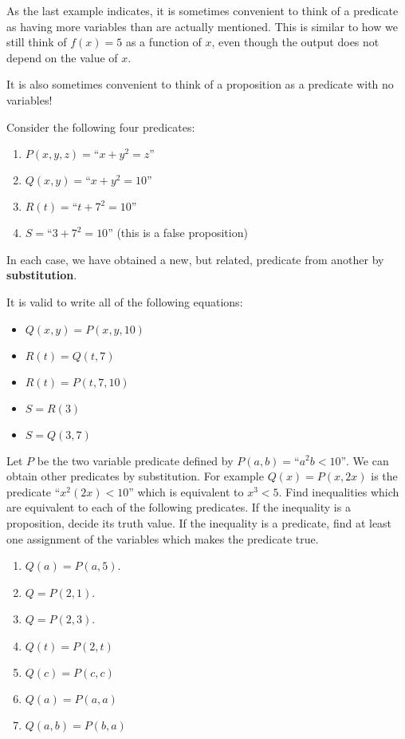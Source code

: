 As the last example indicates, it is sometimes convenient to think of a predicate as having more variables than are actually mentioned.  This is similar to how we still think of $f(x) = 5$ as a function of $x$, even though the output does not depend on the value of $x$.

It is also sometimes convenient to think of a proposition as a predicate with no variables!

Consider the following four predicates:

\begin{enumerate}
	\item $P(x,y,z) = \textrm{``\(x+y^2 = z\)''}$
	\item $Q(x,y) = \textrm{``\(x+y^2 = 10\)''}$
	\item $R(t) = \textrm{``\(t+7^2 = 10\)''}$
	\item $S = \textrm{``\(3+7^2 = 10\)''}$ (this is a false proposition)
	\end{enumerate}

In each case, we have obtained a new, but related, predicate from another by \textbf{substitution}.

It is valid to write all of the following equations:

\begin{itemize}
		\item $Q(x,y) = P(x,y,10)$
		\item $R(t) = Q(t,7)$
		\item $R(t) = P(t,7,10)$
		\item $S = R(3)$
		\item $S = Q(3,7)$
	\end{itemize}

\begin{xca}
 Let $P$ be the two variable predicate defined by $P(a,b) = \textrm{``\(a^2b < 10\)''}$.  We can obtain other predicates by substitution.  For example $Q(x) = P(x,2x)$ is the predicate $\textrm{``\(x^2(2x) < 10\)''}$ which is equivalent to $x^3 < 5$.  Find inequalities which are equivalent to each of the following predicates.  If the inequality is a proposition, decide its truth value.  If the inequality is a predicate, find at least one assignment of the variables which makes the predicate true.
		\begin{enumerate}
				\item $Q(a) = P(a,5)$.  
				\item $Q = P(2,1)$.  
				\item $Q = P(2,3)$.
				\item $Q(t) = P(2,t)$
				\item $Q(c) = P(c,c)$
				\item $Q(a) = P(a,a)$
				\item $Q(a,b) = P(b,a)$
		\end{enumerate}
	\end{xca}

